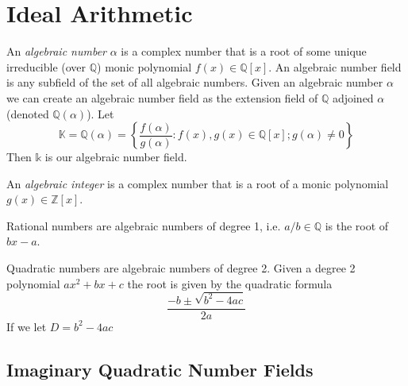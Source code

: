 \documentclass[11pt, letterpaper]{book}
\theoremstyle{definition}
\newcommand{\ZZ}{\mathbb{Z}}
\newcommand{\QQ}{\mathbb{Q}}
\begin{document}
\setcounter{chapter}{1}
\chapter{Ideal Arithmetic}

An \emph{algebraic number} $\alpha$ is a complex number that is a root of some unique irreducible (over $\QQ$) monic polynomial $f(x) \in \QQ[x]$.  An algebraic number field is any subfield of the set of all algebraic numbers.  Given an algebraic number $\alpha$ we can create an algebraic number field as the extension field of $\QQ$ adjoined $\alpha$ (denoted $\QQ(\alpha)$). Let
\[
	\mathbb{K} = \QQ(\alpha) = \left\{ \frac{f(\alpha)}{g(\alpha)} : f(x), g(x) \in \QQ[x]; g(\alpha) \ne 0 \right\}
\]
Then $\mathbb{k}$ is our algebraic number field.

\bigbreak
An \emph{algebraic integer} is a complex number that is a root of a monic polynomial $g(x) \in \ZZ[x]$.

\bigbreak
Rational numbers are algebraic numbers of degree 1, i.e. $a/b \in \QQ$ is the root of $bx - a$.

\bigbreak
Quadratic numbers are algebraic numbers of degree 2.  Given a degree 2 polynomial $ax^2 + bx + c$ the root is given by the quadratic formula
\[
	\frac{-b \pm \sqrt{b^2 - 4ac}}{2a}
\]
If we let $D = b^2 -4ac$

\section{Imaginary Quadratic Number Fields}
\end{document}
